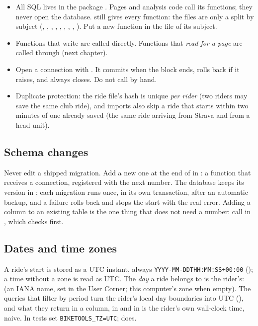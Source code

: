 \begin{itemize}
\item All SQL lives in the package . Pages and analysis code call its functions; they never open
  the database.  still gives every function: the files are only a split by subject
  (, , , , , , , ,
  ). Put a new function in the file of its subject.
\item Functions that write are called directly. Functions that \emph{read for a page} are called through
   (next chapter).
\item Open a connection with . It commits when the block ends, rolls back if it raises,
  and always closes. Do not call  by hand.
\item Duplicate protection: the ride file's hash is unique \emph{per rider} (two riders may save the same club ride),
  and imports also skip a ride that starts within two minutes of one already saved (the same ride arriving from
  Strava and from a head unit).
\end{itemize}

\subsection*{Schema changes}

Never edit a shipped migration. Add a new one at the end of  in : a function that
receives a connection, registered with the next number. The database keeps its version in ;
each migration runs once, in its own transaction, after an automatic backup, and a failure rolls back and stops the
start with the real error. Adding a column to an existing table is the one thing that does not need a number: call
 in , which checks  first.

\subsection*{Dates and time zones}

A ride's start is stored as a UTC instant, always \texttt{YYYY-MM-DDTHH:MM:SS+00:00} (); a time
without a zone is read as UTC. The \emph{day} a ride belongs to is the rider's:  (an IANA name,
set in the User Corner; this computer's zone when empty). The queries that filter by period turn the rider's local
day boundaries into UTC (), and what they return in a  column, in
 and in  is the rider's own wall-clock time, naive. In tests set
\texttt{BIKETOOLS\_TZ=UTC};  does.

